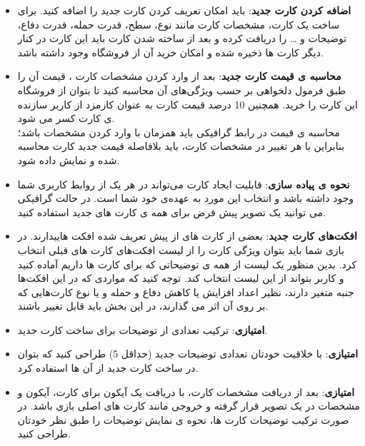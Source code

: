 \documentclass[]{article}
\begin{document}
\begin{itemize}
    \item \textbf{اضافه کردن کارت جدید}: باید امکان تعریف کردن کارت جدید را اضافه کنید. برای ساخت یک کارت، مشخصات کارت مانند نوع، سطح، قدرت حمله، قدرت دفاع، توضیحات و … را دریافت کرده و بعد از ساخته شدن کارت باید این کارت در کنار دیگر کارت ها ذخیره شده و امکان خرید آن از فروشگاه وجود داشته باشد.
    \item \textbf{محاسبه ی قیمت کارت جدید}: بعد از وارد کردن مشخصات کارت ، قیمت آن را طبق فرمول دلخواهی بر حسب ویژگی‌های آن محاسبه کنید تا بتوان از فروشگاه این کارت را خرید. همچنین 10 درصد قیمت کارت به عنوان کارمزد از کاربر سازنده ی کارت کسر می شود. \\
    محاسبه ی قیمت در رابط گرافیکی باید همزمان با وارد کردن مشخصات باشد؛ بنابراین با هر تغییر در مشخصات کارت، باید بلافاصله قیمت جدید کارت محاسبه شده و نمایش داده شود.
    \item \textbf{نحوه ی پیاده سازی}: قابلیت ایجاد کارت می‌تواند در هر یک از روابط کاربری شما وجود داشته باشد و انتخاب این مورد به عهده‌ی خود شما است. در حالت گرافیکی می توانید یک تصویر پیش فرض برای همه ی کارت های جدید استفاده کنید. 
    \item \textbf{افکت‌های کارت جدید}: 
    بعضی از کارت های از پیش تعریف شده افکت ‌هاییدارند. در بازی شما باید بتوان ویژگی کارت را از لیست افکت‌های کارت های قبلی انتخاب کرد. بدین منظور یک لیست از همه ی توضیحاتی که برای کارت ها داریم آماده کنید و کاربر بتواند از این لیست انتخاب کند. توجه کنید که مواردی که در این افکت‌ها جنبه متغیر دارند، نظیر اعداد افزایش یا کاهش دفاع و حمله و یا نوع کارت‌هایی که بر روی آن اثر می گذارند، در این بخش باید قابل تغییر باشند.
    \item \textbf{امتیازی}: ترکیب تعدادی از توضیحات برای ساخت کارت جدید.
    \item \textbf{امتیازی}: با خلاقیت خودتان تعدادی توضیحات جدید (حداقل 5) طراحی کنید که بتوان در ساخت کارت جدید از آن ها استفاده کرد.
    \item \textbf{امتیازی}: بعد از دریافت مشخصات کارت، با دریافت یک آیکون برای کارت، آیکون و مشخصات در یک تصویر قرار گرفته و خروجی مانند کارت های اصلی بازی باشد. در صورت ترکیب توضیحات کارت ها، نحوه ی نمایش توضیحات را طبق نظر خودتان طراحی کنید.
\end{itemize}
\end{document}
